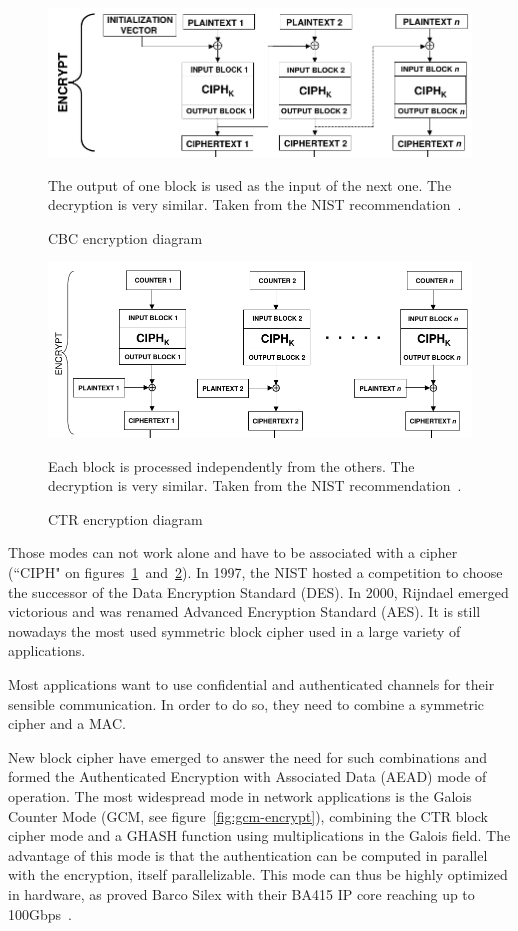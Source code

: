 \begin{figure}
\includegraphics[width=\textwidth]{nist-cbc}
\caption{CBC encryption diagram}{The output of one block is used as the input of the next one. The decryption is very similar. Taken from the NIST recommendation~\cite{nist-sp800-38A}.}
\label{fig:cbc-encrypt}
\end{figure}

\begin{figure}
\includegraphics[width=\textwidth]{nist-ctr}
\caption{CTR encryption diagram}{Each block is processed independently from the others. The decryption is very similar. Taken from the NIST recommendation~\cite{nist-sp800-38A}.}
\label{fig:ctr-encrypt}
\end{figure}

Those modes can not work alone and have to be associated with a cipher (``CIPH" on figures~\ref{fig:cbc-encrypt}~and~\ref{fig:ctr-encrypt}).
In 1997, the NIST hosted a competition to choose the successor of the Data Encryption Standard (DES).
In 2000, Rijndael emerged victorious and was renamed Advanced Encryption Standard (AES).
It is still nowadays the most used symmetric block cipher used in a large variety of applications.\newline{}

Most applications want to use confidential and authenticated channels for their sensible communication.
In order to do so, they need to combine a symmetric cipher and a MAC.

\noindent New block cipher have emerged to answer the need for such combinations and formed the Authenticated Encryption with Associated Data (AEAD) mode of operation.
The most widespread mode in network applications is the Galois Counter Mode (GCM, see figure~\ref{fig:gcm-encrypt}), combining the CTR block cipher mode and a GHASH function using multiplications in the Galois field.
The advantage of this mode is that the authentication can be computed in parallel with the encryption, itself parallelizable.
This mode can thus be highly optimized in hardware, as proved Barco Silex with their BA415 IP core reaching up to 100Gbps~\cite{barco-ba415}.

